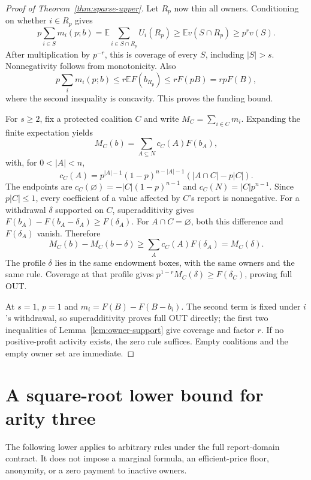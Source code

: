\begin{proof}[Proof of Theorem~\ref{thm:sparse-upper}]
Let $R_p$ now thin all owners. Conditioning on whether $i\in R_p$ gives
\[
 p\sum_{i\in S}m_i(p;b)
 =\mathbb E\sum_{i\in S\cap R_p}U_i(R_p)
 \ge\mathbb E v(S\cap R_p)\ge p^r v(S).
\]
After multiplication by $p^{-r}$, this is coverage of every $S$, including
$|S|>s$. Nonnegativity follows from monotonicity. Also
\[
 p\sum_i m_i(p;b)\le r\mathbb E F(b_{R_p})
 \le rF(pB)=rpF(B),
\]
where the second inequality is concavity. This proves the funding bound.

For $s\ge2$, fix a protected coalition $C$ and write $M_C=\sum_{i\in C}m_i$.
Expanding the finite expectation yields
\[
 M_C(b)=\sum_{A\subseteq N}c_C(A)F(b_A),
\]
with, for $0<|A|<n$,
\begin{equation}\label{eq:coefficient}
 c_C(A)=p^{|A|-1}(1-p)^{n-|A|-1}(|A\cap C|-p|C|).
\end{equation}
The endpoints are $c_C(\varnothing)=-|C|(1-p)^{n-1}$ and
$c_C(N)=|C|p^{n-1}$. Since $p|C|\le1$, every coefficient of a value affected
by $C$'s report is nonnegative. For a withdrawal $\delta$ supported on $C$,
superadditivity gives
$F(b_A)-F(b_A-\delta_A)\ge F(\delta_A)$.
For $A\cap C=\varnothing$, both this difference and $F(\delta_A)$ vanish.
Therefore
\[
 M_C(b)-M_C(b-\delta)\ge\sum_A c_C(A)F(\delta_A)=M_C(\delta).
\]
The profile $\delta$ lies in the same endowment boxes, with the same owners
and the same rule. Coverage at that profile gives
$p^{1-r}M_C(\delta)\ge F(\delta_C)$, proving full OUT.

At $s=1$, $p=1$ and $m_i=F(B)-F(B-b_i)$. The second term is fixed under
$i$'s withdrawal, so superadditivity proves full OUT directly; the first two
inequalities of Lemma~\ref{lem:owner-support} give coverage and factor $r$.
If no positive-profit activity exists, the zero rule suffices. Empty
coalitions and the empty owner set are immediate.
\end{proof}

\section{A square-root lower bound for arity three}\label{sec:lower}
The following lower applies to arbitrary rules under the full report-domain
contract. It does not impose a marginal formula, an efficient-price floor,
anonymity, or a zero payment to inactive owners.

